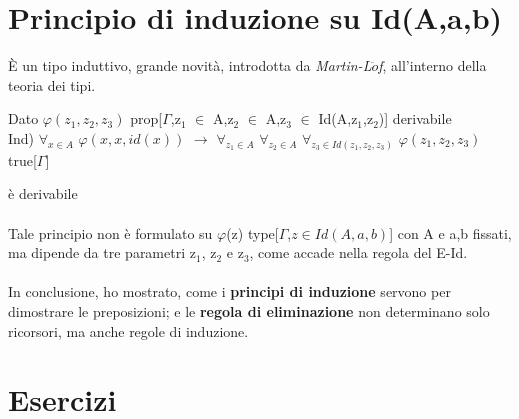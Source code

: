 \section{Principio di induzione su Id(A,a,b)}
\label{sec:principio-di-induzione-Id}
\`E un tipo induttivo, grande novit\`a, introdotta da \textit{Martin-L$\ddot{o}$f}, all'interno della teoria dei tipi.\\
\begin{center}Dato $\varphi(z_1,z_2,z_3)$ prop[$\Gamma$,z$_1$ $\in$ A,z$_2$ $\in$ A,z$_3$ $\in$ Id(A,z$_1$,z$_2$)] derivabile\\
Ind) $\forall_{x \in A}$ $\varphi(x,x,id(x))$ $\rightarrow$ $\forall_{z_1 \in A}$ $\forall_{z_2 \in A}$ $\forall_{z_3 \in Id(z_1,z_2,z_3)}$ $\varphi(z_1,z_2,z_3)$ true[$\Gamma$]\end{center} \`e derivabile\\\\
\noindent
Tale principio non \`e formulato su $\varphi$(z) type[$\Gamma$,$z \in Id(A,a,b)$] con A e a,b fissati, ma dipende da tre parametri z$_1$, z$_2$ e z$_3$, come accade nella regola del E-Id.\\\\
\noindent In conclusione,  ho mostrato, come i \textbf{principi di induzione} servono per dimostrare le preposizioni; e le \textbf{regola di eliminazione} non determinano solo ricorsori, ma anche regole di induzione.

\section{Esercizi}
\label{sec:esercizi-principi-induzione}
